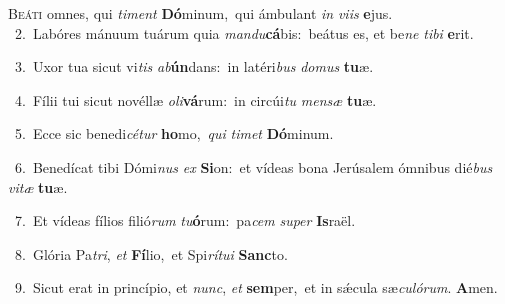 \lettrine{\initial\textcolor{\initialcolor}{B}}{eáti} omnes, qui \textit{ti}\-\textit{ment} \textbf{Dó}\-minum,~\star qui ámbulant \textit{in} \textit{vi}\-\textit{is} \textbf{e}\-jus.\\
{\numbfont\textcolor{\numbcolor}{~2.}}~Labóres mánuum tuárum quia \textit{man}\-\textit{du}\textbf{cá}bis:~\star beátus es, et be\textit{ne} \textit{ti}\-\textit{bi} \textbf{e}\-rit.\par
{\numbfont\textcolor{\numbcolor}{~3.}}~Uxor tua sicut vi\textit{tis} \textit{ab}\-\textbf{ún}dans:~\star in latéri\textit{bus} \textit{do}\-\textit{mus} \textbf{tu}\-æ.\par
{\numbfont\textcolor{\numbcolor}{~4.}}~Fílii tui sicut novéllæ \textit{o}\-\textit{li}\textbf{vá}rum:~\star in circúi\textit{tu} \textit{men}\-\textit{sæ} \textbf{tu}\-æ.\par
{\numbfont\textcolor{\numbcolor}{~5.}}~Ecce sic benedi\-\textit{cé}\-\textit{tur} \textbf{ho}\-mo,~\star \textit{qui} \textit{ti}\-\textit{met} \textbf{Dó}\-minum.\par
{\numbfont\textcolor{\numbcolor}{~6.}}~Benedícat tibi Dómi\textit{nus} \textit{ex} \textbf{Si}\-on:~\star et vídeas bona Jerúsalem ómnibus dié\textit{bus} \textit{vi}\-\textit{tæ} \textbf{tu}\-æ.\par
{\numbfont\textcolor{\numbcolor}{~7.}}~Et vídeas fílios filió\textit{rum} \textit{tu}\-\textbf{ó}rum:~\star pa\textit{cem} \textit{su}\-\textit{per} \textbf{Is}\-raël.\par
{\numbfont\textcolor{\numbcolor}{~8.}}~Glória Pa\-\textit{tri}\-, \textit{et} \textbf{Fí}\-lio,~\star et Spi\-\textit{rí}\-\textit{tu}\textit{i} \textbf{Sanc}\-to.\par
{\numbfont\textcolor{\numbcolor}{~9.}}~Sicut erat in princípio, et \textit{nunc}\-, \textit{et} \textbf{sem}\-per,~\star et in sǽcula sæ\-\textit{cu}\-\textit{ló}\textit{rum}. \textbf{A}\-men.\par
